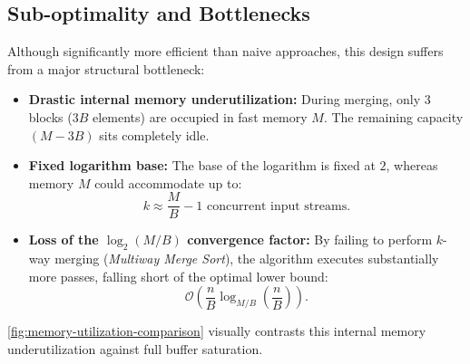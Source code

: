 \subsection{Sub-optimality and Bottlenecks}
\label{subsec:suboptimality}

Although significantly more efficient than naive approaches, this design suffers from a major structural bottleneck:
\begin{itemize}
  \item \textbf{Drastic internal memory underutilization:} During merging, only $3$ blocks ($3B$ elements) are occupied in fast memory $M$. The remaining capacity $(M - 3B)$ sits completely idle.
  \item \textbf{Fixed logarithm base:} The base of the logarithm is fixed at $2$, whereas memory $M$ could accommodate up to:
  \[
    k \approx \frac{M}{B} - 1 \text{ concurrent input streams}.
  \]
  \item \textbf{Loss of the $\log_2(M/B)$ convergence factor:} By failing to perform $k$-way merging (\textit{Multiway Merge Sort}), the algorithm executes substantially more passes, falling short of the optimal lower bound:
  \[
    \mathcal{O}\left(\frac{n}{B} \log_{M/B}\left(\frac{n}{B}\right)\right).
  \]
\end{itemize}

\autoref{fig:memory-utilization-comparison} visually contrasts this internal memory underutilization against full buffer saturation.

